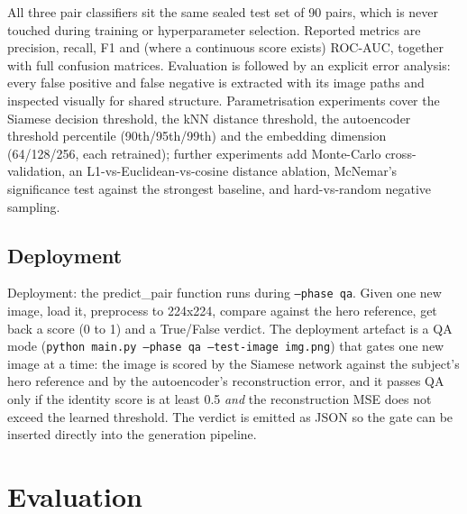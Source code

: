 \documentclass[conference]{IEEEtran}
\begin{document}
All three pair classifiers sit the same sealed test set of 90 pairs, which is
never touched during training or hyperparameter selection. Reported metrics
are precision, recall, F1 and (where a continuous score exists) ROC-AUC,
together with full confusion matrices. Evaluation is followed by an explicit
error analysis: every false positive and false negative is extracted with its
image paths and inspected visually for shared structure. Parametrisation
experiments cover the Siamese decision threshold, the kNN distance threshold,
the autoencoder threshold percentile (90th/95th/99th) and the embedding
dimension (64/128/256, each retrained); further experiments add Monte-Carlo
cross-validation, an L1-vs-Euclidean-vs-cosine distance ablation, McNemar's
significance test against the strongest baseline, and hard-vs-random negative
sampling.

\subsection{Deployment}
Deployment: the predict\_pair function runs during \texttt{--phase qa}. Given one new image, load it, preprocess to 224x224, compare against the hero reference, get back a score (0 to 1) and a True/False verdict.
The deployment artefact is a QA mode (\texttt{python main.py --phase qa
--test-image img.png}) that gates one new image at a time: the image is scored
by the Siamese network against the subject's hero reference and by the
autoencoder's reconstruction error, and it passes QA only if the identity
score is at least 0.5 \emph{and} the reconstruction MSE does not exceed the
learned threshold. The verdict is emitted as JSON so the gate can be inserted
directly into the generation pipeline.

\section{Evaluation}
\label{sec:eval}
\end{document}
